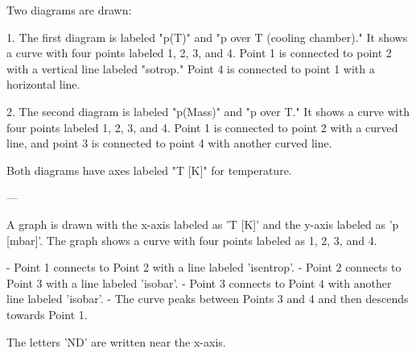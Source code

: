 Two diagrams are drawn:  

1. The first diagram is labeled "p(T)" and "p over T (cooling chamber)." It shows a curve with four points labeled 1, 2, 3, and 4. Point 1 is connected to point 2 with a vertical line labeled "sotrop." Point 4 is connected to point 1 with a horizontal line.  

2. The second diagram is labeled "p(Mass)" and "p over T." It shows a curve with four points labeled 1, 2, 3, and 4. Point 1 is connected to point 2 with a curved line, and point 3 is connected to point 4 with another curved line.  

Both diagrams have axes labeled "T [K]" for temperature.  

---

A graph is drawn with the x-axis labeled as 'T [K]' and the y-axis labeled as 'p [mbar]'. The graph shows a curve with four points labeled as 1, 2, 3, and 4.  

- Point 1 connects to Point 2 with a line labeled 'isentrop'.  
- Point 2 connects to Point 3 with a line labeled 'isobar'.  
- Point 3 connects to Point 4 with another line labeled 'isobar'.  
- The curve peaks between Points 3 and 4 and then descends towards Point 1.  

The letters 'ND' are written near the x-axis.